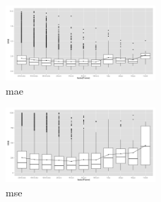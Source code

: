 \begin{figure}[htbp]
	\centering
		\includegraphics[width=0.5\textwidth]{mae.png}
	\caption{mae}
	\label{fig:mae}
\end{figure}


\begin{figure}[htbp]
	\centering
		\includegraphics[width=0.5\textwidth]{mse.png}
	\caption{mse}
	\label{fig:mse}
\end{figure}